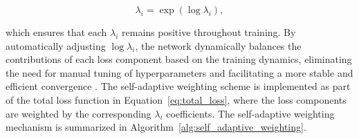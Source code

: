 \documentclass[12pt, a4paper]{article}
\begin{document}
\begin{equation}
    \lambda_i = \exp(\log \lambda_i),
    \label{eq:lambda_definition}
\end{equation}

which ensures that each \(\lambda_i\) remains positive throughout training. By automatically adjusting \(\log \lambda_i\), the network dynamically balances the contributions of each loss component based on the training dynamics, eliminating the need for manual tuning of hyperparameters and facilitating a more stable and efficient convergence \citep{wang2022and}. The self-adaptive weighting scheme is implemented as part of the total loss function in Equation~\eqref{eq:total_loss}, where the loss components are weighted by the corresponding \(\lambda_i\) coefficients. The self-adaptive weighting mechanism is summarized in Algorithm~\ref{alg:self_adaptive_weighting}. 
\end{document}
